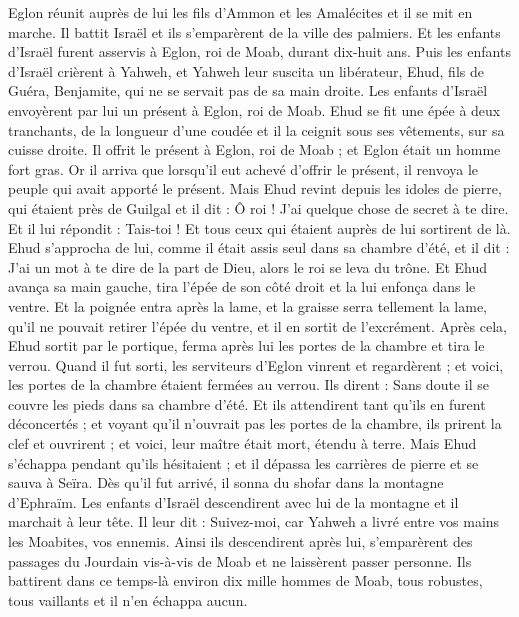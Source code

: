 \begin{multicols}{2}
Eglon réunit auprès de lui les fils d'Ammon et les Amalécites et il se mit en marche. Il battit Israël et ils s'emparèrent de la ville des palmiers.
Et les enfants d'Israël furent asservis à Eglon, roi de Moab, durant dix-huit ans.
Puis les enfants d'Israël crièrent à Yahweh, et Yahweh leur suscita un libérateur, Ehud, fils de Guéra, Benjamite, qui ne se servait pas de sa main droite. Les enfants d'Israël envoyèrent par lui un présent à Eglon, roi de Moab.
Ehud se fit une épée à deux tranchants, de la longueur d'une coudée et il la ceignit sous ses vêtements, sur sa cuisse droite.
Il offrit le présent à Eglon, roi de Moab ; et Eglon était un homme fort gras.
Or il arriva que lorsqu'il eut achevé d'offrir le présent, il renvoya le peuple qui avait apporté le présent.
Mais Ehud revint depuis les idoles de pierre, qui étaient près de Guilgal et il dit : Ô roi ! J'ai quelque chose de secret à te dire. Et il lui répondit : Tais-toi ! Et tous ceux qui étaient auprès de lui sortirent de là.
Ehud s'approcha de lui, comme il était assis seul dans sa chambre d'été, et il dit : J'ai un mot à te dire de la part de Dieu, alors le roi se leva du trône.
Et Ehud avança sa main gauche, tira l'épée de son côté droit et la lui enfonça dans le ventre.
Et la poignée entra après la lame, et la graisse serra tellement la lame, qu'il ne pouvait retirer l'épée du ventre, et il en sortit de l'excrément.
Après cela, Ehud sortit par le portique, ferma après lui les portes de la chambre et tira le verrou.
Quand il fut sorti, les serviteurs d'Eglon vinrent et regardèrent ; et voici, les portes de la chambre étaient fermées au verrou. Ils dirent : Sans doute il se couvre les pieds dans sa chambre d'été.
Et ils attendirent tant qu'ils en furent déconcertés ; et voyant qu'il n'ouvrait pas les portes de la chambre, ils prirent la clef et ouvrirent ; et voici, leur maître était mort, étendu à terre.
Mais Ehud s'échappa pendant qu'ils hésitaient ; et il dépassa les carrières de pierre et se sauva à Seïra.
Dès qu'il fut arrivé, il sonna du shofar dans la montagne d'Ephraïm. Les enfants d'Israël descendirent avec lui de la montagne et il marchait à leur tête.
Il leur dit : Suivez-moi, car Yahweh a livré entre vos mains les Moabites, vos ennemis. Ainsi ils descendirent après lui, s'emparèrent des passages du Jourdain vis-à-vis de Moab et ne laissèrent passer personne.
Ils battirent dans ce temps-là environ dix mille hommes de Moab, tous robustes, tous vaillants et il n'en échappa aucun.

\end{multicols}
